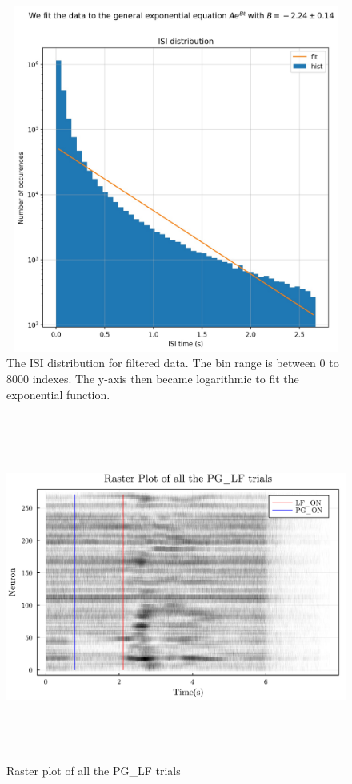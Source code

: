 \documentclass[9pt,twocolumn]{paper-template}
\begin{document}
\begin{figure}
\centering
\includegraphics[width=12cm,height=11.4cm]{isi_logfit.jpg}
\caption{The ISI distribution for filtered data. The bin range is between 0 to 8000 indexes. The y-axis then became logarithmic to fit the exponential function.}\label{fig:isi}
\end{figure}

\begin{figure}
	\centering
	\includegraphics[width=12cm,height=11.4cm]{../Assets/Q7RasterPlot1.pdf}
	\caption{Raster plot of all the PG\_LF trials}\label{fig:event_raster1}
\end{figure}
\end{document}
